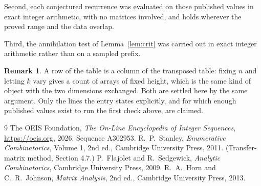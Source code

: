 \documentclass[11pt,a4paper]{article}
\theoremstyle{plain}
\theoremstyle{definition}
\newtheorem{remark}[theorem]{Remark}
\begin{document}
Second, each conjectured recurrence was evaluated on those published values in exact
integer arithmetic, with no matrices involved, and holds wherever the proved range and the
data overlap.

Third, the annihilation test of Lemma~\ref{lem:crit} was carried out in exact integer
arithmetic rather than on a sampled prefix.

\begin{remark}
A row of the table is a column of the transposed table: fixing $n$ and letting $k$ vary gives a
count of arrays of fixed height, which is the same kind of object with the two dimensions
exchanged. Both are settled here by the same argument. Only the lines the entry states
explicitly, and for which enough published values exist to run the first check above, are
claimed.
\end{remark}

\begin{thebibliography}{9}
 The OEIS Foundation, \emph{The On-Line Encyclopedia of Integer
Sequences}, \url{https://oeis.org}, 2026. Sequence A302953.
 R.~P.~Stanley, \emph{Enumerative Combinatorics}, Volume 1, 2nd ed.,
Cambridge University Press, 2011. (Transfer-matrix method, Section 4.7.)
 P.~Flajolet and R.~Sedgewick, \emph{Analytic Combinatorics}, Cambridge
University Press, 2009.
 R.~A.~Horn and C.~R.~Johnson, \emph{Matrix Analysis}, 2nd ed., Cambridge
University Press, 2013.
\end{thebibliography}
\end{document}
